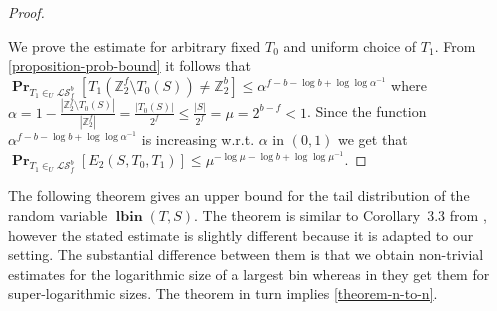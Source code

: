 \documentclass[unicode,review]{siamart1116}
\newcommand{\lbin}[2]{\operatorname{\mathbf{lbin}}({#1}, {#2})}
\newcommand{\vecspace}[2]{\mathbb{Z}_{#1}^{#2}}
\newcommand{\binvecspace}[1]{\vecspace{2}{#1}}
\newcommand{\surjectivelinearmaps}[2]{\mathcal{LS}_{#1}^{#2}}
\newcommand{\probs}[2]{\operatorname{\mathbf{Pr}}_{{#1}}\left[{#2}\right]}
\numberwithin{theorem}{section}
\begin{document}
\begin{proof}
\begin{figure}[h]
\begin{center}
\end{center}
\end{figure}

We prove the estimate for arbitrary fixed $T_0$ and uniform choice of $T_1$.
From \cref{proposition-prob-bound} it follows that $\probs{T_1\in_U \surjectivelinearmaps{f}{b}}{T_1(\binvecspace{f} \setminus T_0(S)) \neq \binvecspace{b}} \leq \alpha ^ {f - b - \log b + \log \log \alpha^{-1}}$ where $\alpha = 1 - \frac{|\binvecspace{f} \setminus T_0(S)|}{|\binvecspace{f}|} = \frac{|T_0(S)|}{2^f} \leq \frac{|S|}{2^f} = \mu = 2^{b - f} < 1$.
Since the function $\alpha ^ {f - b - \log b + \log \log \alpha^{-1}}$ is increasing w.r.t. $\alpha$ in $(0, 1)$ we get that
$
\probs{T_1 \in_U \surjectivelinearmaps{f}{b}}{E_2(S, T_0, T_1)} \leq \mu ^ {-\log \mu - \log b + \log \log \mu^{-1}}.
$
\end{proof}

The following theorem gives an upper bound for the tail distribution of the random variable $\lbin{T}{S}$.
The theorem is similar to Corollary~3.3 from \cite{alonetal}, however the stated estimate is slightly different because it is adapted to our setting.
The substantial difference between them is that we obtain non-trivial estimates for the logarithmic size of a largest bin whereas in \cite{alonetal} they get them for super-logarithmic sizes.
The theorem in turn implies \cref{theorem-n-to-n}.
\end{document}
